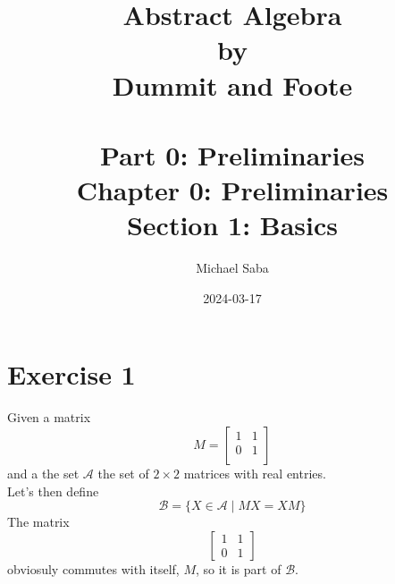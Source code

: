 \documentclass[12pt]{article}
\title{%
    \Huge Abstract Algebra \\
    \large by \\
    \Large Dummit and Foote \\~\\
    \huge Part 0: Preliminaries \\
    \LARGE Chapter 0: Preliminaries \\
    \Large Section 1: Basics
}
\date{2024-03-17}
\author{Michael Saba}
\begin{document}
    \maketitle
    \newpage

    \section*{Exercise 1}
    Given a matrix 
    \[ M = \begin{bmatrix}
        1 & 1 \\
        0 & 1 \\
    \end{bmatrix} \]
    and a the set $\mathcal{A}$
    the set of $2 \times 2$ matrices with real entries.\\
    Let's then define 
    \[ \mathcal{B} = \{ X \in \mathcal{A} \mid MX = XM \} \]
    The matrix
    \[\begin{bmatrix}
        1 & 1 \\
        0 & 1
    \end{bmatrix} \]
    obviosuly commutes with itself, $M$,
    so it is part of $\mathcal{B}$. \\

        
\end{document}
